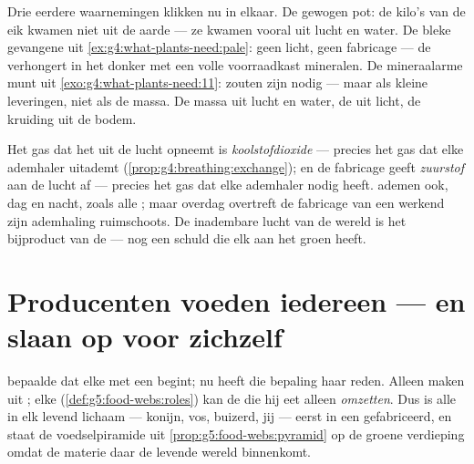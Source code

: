\begin{example}\label{ex:g6:plants-are-producers:evidence}
Drie eerdere waarnemingen klikken nu in elkaar. De gewogen pot: de kilo's
van de eik kwamen niet uit de aarde --- ze kwamen vooral uit lucht en
water. De bleke gevangene uit \cref{ex:g4:what-plants-need:pale}: geen
licht, geen fabricage --- de  verhongert in het donker met een
volle voorraadkast mineralen. De mineraalarme munt uit
\cref{exo:g4:what-plants-need:11}: zouten zijn nodig --- maar als kleine
leveringen, niet als de massa. De massa uit lucht en water, de 
uit licht, de kruiding uit de bodem.
\end{example}

\begin{remark}\label{rem:g6:plants-are-producers:gas}
Het gas dat het  uit de lucht opneemt is \emph{koolstofdioxide} ---
precies het gas dat elke ademhaler uitademt
(\cref{prop:g4:breathing:exchange}); en de fabricage geeft
\emph{zuurstof} aan de lucht af --- precies het gas dat elke ademhaler
nodig heeft.  ademen ook, dag en nacht, zoals alle ;
maar overdag overtreft de fabricage van een werkend  zijn ademhaling
ruimschoots. De inadembare lucht van de wereld is het bijproduct van de
 --- nog een schuld die elk  aan het groen heeft.
\end{remark}

\section{Producenten voeden iedereen --- en slaan op voor zichzelf}

\begin{proposition}\label{prop:g6:plants-are-producers:firstlink}
 bepaalde dat elke  met een
 begint; nu heeft die bepaling haar reden. Alleen  maken
 uit ; elke 
(\cref{def:g5:food-webs:roles}) kan de  die hij eet
alleen \emph{omzetten}. Dus is alle  in elk levend
lichaam --- konijn, vos, buizerd, jij --- eerst in een  gefabriceerd,
en staat de voedselpiramide uit \cref{prop:g5:food-webs:pyramid} op de
groene verdieping omdat de materie daar de levende wereld binnenkomt.
\end{proposition}
\admitted


